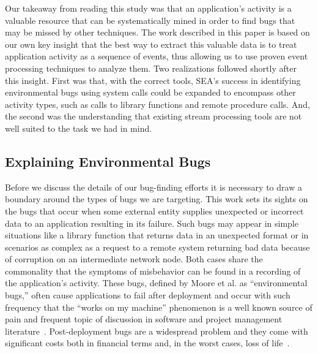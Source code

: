 Our takeaway
from reading this study
was that an application's activity
is a valuable resource that can be systematically mined
in order to find bugs
that may be missed by other techniques.
The work described in this paper
is based on our own key insight that the best way to extract this
valuable data
is to treat application activity
as a sequence of events,
thus allowing us to use
proven event processing techniques
to analyze them.
Two realizations followed shortly after this
insight.
First was that, with the correct tools,
SEA's success in identifying environmental bugs using system calls
could be expanded
to encompass other activity types,
such as calls to library functions
and remote procedure calls.
And, the second was the understanding that existing
stream processing tools
are not well suited to the
task we had in mind.



\subsection{Explaining Environmental Bugs}

Before we discuss the details of our bug-finding efforts it is necessary to
draw a boundary around the types of bugs we are targeting.
This work sets its sights on the bugs that occur when some external
entity supplies unexpected or incorrect data to an
application resulting in its failure.
Such bugs may appear in simple situations like a library function that
returns data in an unexpected format or in scenarios as complex
as a request to a remote
system returning bad data because of corruption on an intermediate network
node.
Both cases share the commonality that the symptoms of misbehavior
can be found in a recording of the application's activity.
These bugs, defined by Moore et al. as ``environmental bugs,''
often cause applications to fail after deployment
and occur with such frequency
that the ``works on my machine'' phenomenon is a well known
source of pain
and frequent topic of discussion
in software and project management
literature~\cite{worksonmymachine}.
Post-deployment bugs are a widespread problem
and they come with significant costs
both in financial terms and,
in the worst cases,
loss of life~\cite{WONG201768}.

